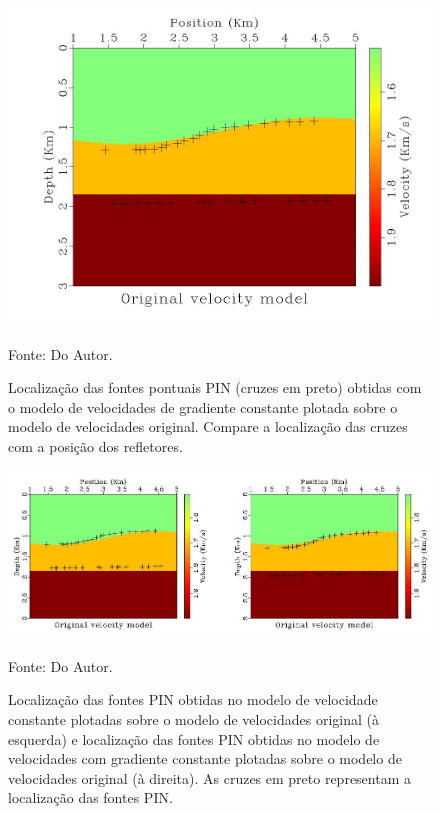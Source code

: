\begin{figure}[H]
\caption{Localização das fontes pontuais PIN (cruzes em preto)
obtidas com o modelo de velocidades de gradiente
constante plotada sobre o modelo de velocidades original.
Compare a localização das cruzes com a posição dos refletores.}
\begin{center}
\includegraphics[scale=0.3]{images/gzvel.jpeg}
\vspace{-0.3cm}
\end{center}
\begin{center}
 Fonte: Do Autor.
\end{center}
\label{fig:3.3}
\end{figure}


\begin{figure}[H]
\caption{Localização das fontes PIN obtidas no modelo de velocidade constante
plotadas sobre o modelo de velocidades original (à esquerda)
e localização das fontes PIN obtidas no modelo de velocidades com gradiente constante
plotadas sobre o modelo de velocidades original (à direita).
As cruzes em preto representam a localização das fontes PIN.}
\begin{center}
\includegraphics[scale=2]{images/resultinv.jpeg}
\vspace{-0.3cm}
\end{center}
\begin{center}
 Fonte: Do Autor.
\end{center}
\label{fig:3.4}
\end{figure}
